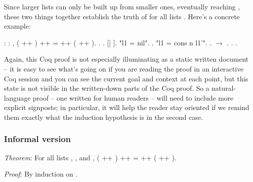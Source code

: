 \documentclass[12pt]{report}
\begin{document}
    Since larger lists can only be built up from smaller ones,
    eventually reaching , these two things together establish the
    truth of  for all lists .  Here's a concrete example: \begin{coqdoccode}
\coqdocemptyline
\coqdocnoindent
{}  : \coqdockw{\ensuremath{\forall}}    : , \coqdoceol
\coqdocindent{1.00em}
( ++ ) ++  =  ++ ( ++ ).\coqdoceol
\coqdocnoindent
{}.\coqdoceol
\coqdocindent{1.00em}
   .    [|  ].\coqdoceol
\coqdocindent{1.00em}
 "l1 = nil".\coqdoceol
\coqdocindent{2.00em}
.\coqdoceol
\coqdocindent{1.00em}
 "l1 = cons n l1'".\coqdoceol
\coqdocindent{2.00em}
.  \ensuremath{\rightarrow} . . .\coqdoceol
\coqdocemptyline
\end{coqdoccode}
Again, this Coq proof is not especially illuminating as a
    static written document -- it is easy to see what's going on if
    you are reading the proof in an interactive Coq session and you
    can see the current goal and context at each point, but this state
    is not visible in the written-down parts of the Coq proof.  So a
    natural-language proof -- one written for human readers -- will
    need to include more explicit signposts; in particular, it will
    help the reader stay oriented if we remind them exactly what the
    induction hypothesis is in the second case.  

\subsubsection{Informal version}



 \textit{Theorem}: For all lists , , and , 
   ( ++ ) ++  =  ++ ( ++ ).


   \textit{Proof}: By induction on .
\end{document}
